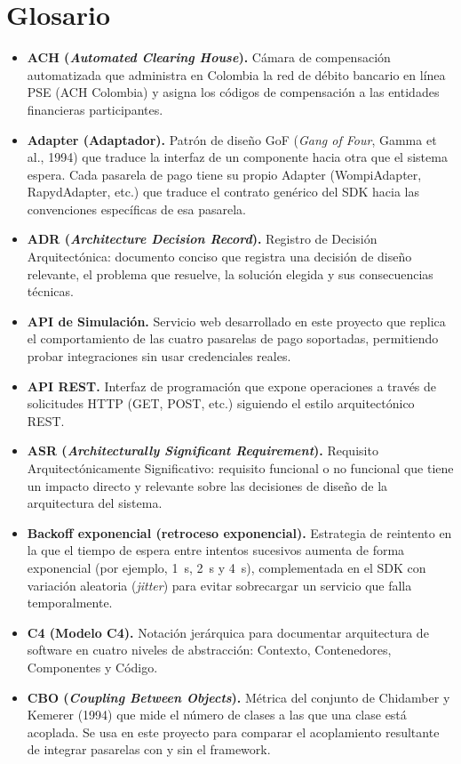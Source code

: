 \section{Glosario}
\begin{itemize}
    \item \textbf{ACH (\textit{Automated Clearing House}).} Cámara de compensación automatizada que administra en Colombia la red de débito bancario en línea PSE (ACH Colombia) y asigna los códigos de compensación a las entidades financieras participantes.
    \item \textbf{Adapter (Adaptador).} Patrón de diseño GoF (\textit{Gang of Four}, Gamma et al., 1994) que traduce la interfaz de un componente hacia otra que el sistema espera. Cada pasarela de pago tiene su propio Adapter (WompiAdapter, RapydAdapter, etc.) que traduce el contrato genérico del SDK hacia las convenciones específicas de esa pasarela.
    \item \textbf{ADR (\textit{Architecture Decision Record}).} Registro de Decisión Arquitectónica: documento conciso que registra una decisión de diseño relevante, el problema que resuelve, la solución elegida y sus consecuencias técnicas.
    \item \textbf{API de Simulación.} Servicio web desarrollado en este proyecto que replica el comportamiento de las cuatro pasarelas de pago soportadas, permitiendo probar integraciones sin usar credenciales reales.
    \item \textbf{API REST.} Interfaz de programación que expone operaciones a través de solicitudes HTTP (GET, POST, etc.) siguiendo el estilo arquitectónico REST.
    \item \textbf{ASR (\textit{Architecturally Significant Requirement}).} Requisito Arquitectónicamente Significativo: requisito funcional o no funcional que tiene un impacto directo y relevante sobre las decisiones de diseño de la arquitectura del sistema.
    \item \textbf{Backoff exponencial (retroceso exponencial).} Estrategia de reintento en la que el tiempo de espera entre intentos sucesivos aumenta de forma exponencial (por ejemplo, 1~s, 2~s y 4~s), complementada en el SDK con variación aleatoria (\textit{jitter}) para evitar sobrecargar un servicio que falla temporalmente.
    \item \textbf{C4 (Modelo C4).} Notación jerárquica para documentar arquitectura de software en cuatro niveles de abstracción: Contexto, Contenedores, Componentes y Código.
    \item \textbf{CBO (\textit{Coupling Between Objects}).} Métrica del conjunto de Chidamber y Kemerer (1994) que mide el número de clases a las que una clase está acoplada. Se usa en este proyecto para comparar el acoplamiento resultante de integrar pasarelas con y sin el framework.

\end{itemize}

